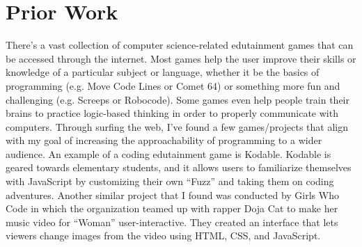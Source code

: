 \documentclass[10pt,twocolumn]{article}
\begin{document}
\section{Prior Work}
There’s a vast collection of computer science-related edutainment games that can be accessed through the internet. Most games help the user improve their skills or knowledge of a particular subject or language, whether it be the basics of programming (e.g. Move Code Lines or Comet 64) or something more fun and challenging (e.g. Screeps or Robocode). Some games even help people train their brains to practice logic-based thinking in order to properly communicate with computers. 
Through surfing the web, I’ve found a few games/projects that align with my goal of increasing the approachability of programming to a wider audience. An example of a coding edutainment game is Kodable. Kodable is geared towards elementary students, and it allows users to familiarize themselves with JavaScript by customizing their own “Fuzz” and taking them on coding adventures. Another similar project that I found was conducted by Girls Who Code in which the organization teamed up with rapper Doja Cat to make her music video for “Woman” user-interactive. They created an interface that lets viewers change images from the video using HTML, CSS, and JavaScript. 



\printbibliography 
\end{document}
